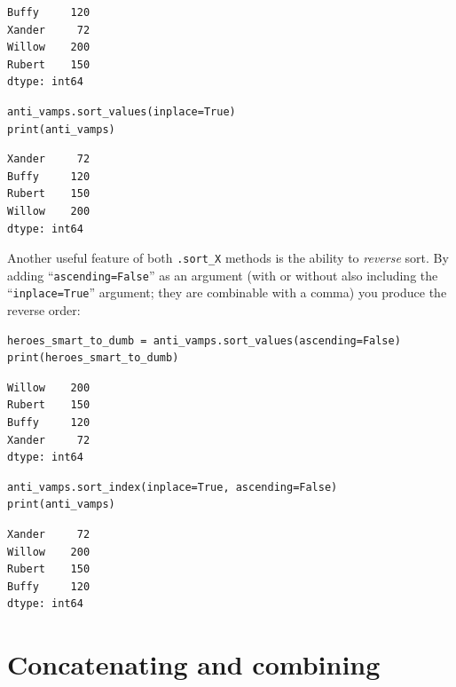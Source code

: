 \begin{Verbatim}[fontsize=\small,samepage=true,frame=leftline,framesep=5mm,framerule=1mm]
Buffy     120
Xander     72
Willow    200
Rubert    150
dtype: int64
\end{Verbatim}

\begin{Verbatim}[fontsize=\small,samepage=true,frame=single,framesep=3mm]
anti_vamps.sort_values(inplace=True)
print(anti_vamps)
\end{Verbatim}
\vspace{-.3in}

\begin{Verbatim}[fontsize=\small,samepage=true,frame=leftline,framesep=5mm,framerule=1mm]
Xander     72
Buffy     120
Rubert    150
Willow    200
dtype: int64
\end{Verbatim}

Another useful feature of both \texttt{.sort\_X} methods is the ability to
\textit{reverse} sort. By adding ``\texttt{ascending=False}'' as an argument
(with or without also including the ``\texttt{inplace=True}'' argument; they
are combinable with a comma) you produce the reverse order:

\begin{Verbatim}[fontsize=\footnotesize,samepage=true,frame=single,framesep=3mm]
heroes_smart_to_dumb = anti_vamps.sort_values(ascending=False)
print(heroes_smart_to_dumb)
\end{Verbatim}
\vspace{-.3in}

\begin{Verbatim}[fontsize=\small,samepage=true,frame=leftline,framesep=5mm,framerule=1mm]
Willow    200
Rubert    150
Buffy     120
Xander     72
dtype: int64
\end{Verbatim}

\begin{Verbatim}[fontsize=\small,samepage=true,frame=single,framesep=3mm]
anti_vamps.sort_index(inplace=True, ascending=False)
print(anti_vamps)
\end{Verbatim}
\vspace{-.3in}

\begin{Verbatim}[fontsize=\small,samepage=true,frame=leftline,framesep=5mm,framerule=1mm]
Xander     72
Willow    200
Rubert    150
Buffy     120
dtype: int64
\end{Verbatim}

\section{Concatenating and combining}

